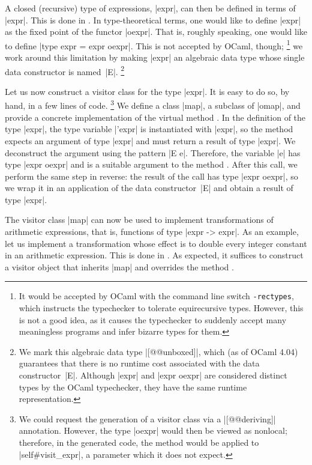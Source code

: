 \documentclass[11pt,a4paper,twoside]{article}
\begin{document}
A closed (recursive) type of expressions, \oc|expr|, can then be defined in
terms of \oc|expr|. This is done in . In type-theoretical
terms, one would like to define \oc|expr| as the fixed point of the functor
\oc|oexpr|.
That is, roughly speaking, one would like to define \oc|type expr = expr oexpr|.
This is not accepted by OCaml, though;%
%
\footnote{It would be accepted by OCaml with the command line switch
  \texttt{-rectypes}, which instructs the typechecker to tolerate
  equirecursive types. However, this is not a good idea, as it causes
  the typechecker to suddenly accept many meaningless programs and infer
  bizarre types for them.}
%
we work around this limitation by making \oc|expr| an algebraic data type
whose single data constructor is named~\oc|E|.%
%
\footnote{We mark this algebraic data type \oc|[@@unboxed]|, which (as of
  OCaml 4.04) guarantees that there is no runtime cost associated with the
  data constructor~\oc|E|. Although \oc|expr| and \oc|expr oexpr| are
  considered distinct types by the OCaml typechecker, they have the same
  runtime representation.}

Let us now construct a visitor class for the type \oc|expr|. It is easy to
do so, by hand, in a few lines of code.%
%
\footnote{We could request the generation of a visitor class via a
  \oc|[@@deriving]| annotation. However, the type \oc|oexpr| would then be
  viewed as nonlocal; therefore, in the generated code, the method
   would be applied to \oc|self#visit_expr|, a
  parameter which it does not expect.}
%
%
We define a class \oc|map|, a subclass of \oc|omap|, and provide a concrete
implementation of the virtual method . In the definition
of the type \oc|expr|, the type variable \oc|'expr| is instantiated with
\oc|expr|, so the method  expects an argument of type
\oc|expr| and must return a result of type \oc|expr|. We deconstruct the
argument using the pattern \oc|E e|. Therefore, the variable \oc|e| has type
\oc|expr oexpr| and is a suitable argument to the method .
After this call, we perform the same step in reverse: the result of the call
has type \oc|expr oexpr|, so we wrap it in an application of the data
constructor~\oc|E| and obtain a result of type \oc|expr|.

The visitor class \oc|map| can now be used to implement transformations of
arithmetic expressions, that is, functions of type \oc|expr -> expr|. As an
example, let us implement a transformation whose effect is to double every
integer constant in an arithmetic expression. This is done in
. As expected, it suffices to construct a visitor
object that inherits \oc|map| and overrides the method
.
\end{document}
